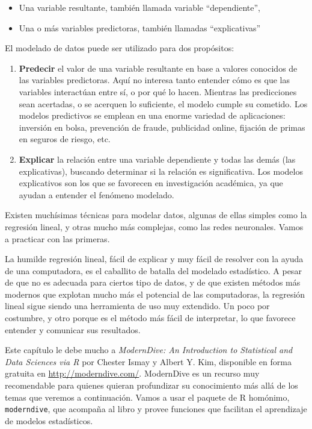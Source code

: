 \documentclass[
]{book}
\providecommand{\tightlist}{%
  \setlength{\itemsep}{0pt}\setlength{\parskip}{0pt}}
\begin{document}
\begin{itemize}
\tightlist
\item
  Una variable resultante, también llamada variable ``dependiente'',
\item
  Una o más variables predictoras, también llamadas ``explicativas''
\end{itemize}

El modelado de datos puede ser utilizado para dos propósitos:

\begin{enumerate}
\def\labelenumi{\arabic{enumi}.}
\item
  \textbf{Predecir} el valor de una variable resultante en base a valores conocidos de las variables predictoras. Aquí no interesa tanto entender cómo es que las variables interactúan entre sí, o por qué lo hacen. Mientras las predicciones sean acertadas, o se acerquen lo suficiente, el modelo cumple su cometido. Los modelos predictivos se emplean en una enorme variedad de aplicaciones: inversión en bolsa, prevención de fraude, publicidad online, fijación de primas en seguros de riesgo, etc.
\item
  \textbf{Explicar} la relación entre una variable dependiente y todas las demás (las explicativas), buscando determinar si la relación es significativa. Los modelos explicativos son los que se favorecen en investigación académica, ya que ayudan a entender el fenómeno modelado.
\end{enumerate}

Existen muchísimas técnicas para modelar datos, algunas de ellas simples como la regresión lineal, y otras mucho más complejas, como las redes neuronales. Vamos a practicar con las primeras.

La humilde regresión lineal, fácil de explicar y muy fácil de resolver con la ayuda de una computadora, es el caballito de batalla del modelado estadístico. A pesar de que no es adecuada para ciertos tipo de datos, y de que existen métodos más modernos que explotan mucho más el potencial de las computadoras, la regresión lineal sigue siendo una herramienta de uso muy extendido. Un poco por costumbre, y otro porque es el método más fácil de interpretar, lo que favorece entender y comunicar sus resultados.

Este capítulo le debe mucho a \emph{ModernDive: An Introduction to Statistical and Data Sciences via R} por Chester Ismay y Albert Y. Kim, disponible en forma gratuita en \url{http://moderndive.com/}. ModernDive es un recurso muy recomendable para quienes quieran profundizar su conocimiento más allá de los temas que veremos a continuación. Vamos a usar el paquete de R homónimo, \texttt{moderndive}, que acompaña al libro y provee funciones que facilitan el aprendizaje de modelos estadísticos.
\end{document}
